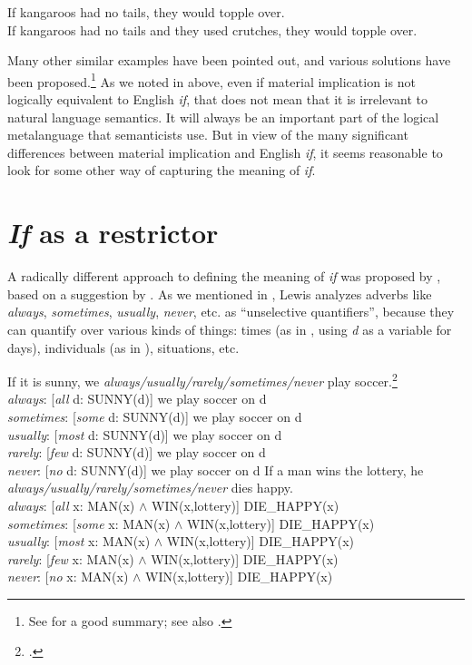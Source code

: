 \ea \label{ex:19.26}
\ea  If kangaroos had no tails, they would topple over.\\
\ex If kangaroos had no tails and they used crutches, they would topple over.
                       \z
\z


Many other similar examples have been pointed out, and various solutions have been proposed.\footnote{See  for a good summary; see also \textcites[83--87]{Gazdar1979}[ch2--3]{Bennett2003}.} As we noted in  above, even if material implication is not logically equivalent to English \textit{if}, that does not mean that it is irrelevant to natural language semantics. It will always be an important part of the logical metalanguage that semanticists use. But in view of the many significant differences between material implication and English \textit{if}, it seems reasonable to look for some other way of capturing the meaning of \textit{if}.


\section{\textit{If} as a restrictor}\label{sec:19.5}

A radically different approach to defining the meaning of \textit{if} was proposed by \citet{Kratzer1986}, based on a suggestion by \citet{Lewis1975}. As we mentioned in , Lewis analyzes adverbs like \textit{always}, \textit{sometimes}, \textit{usually}, \textit{never}, etc. as “unselective quantifiers”, because they can quantify over various kinds of things: times (as in , using \textit{d} as a variable for days), individuals (as in ), situations, etc.


\ea \label{ex:19.27}
If it is sunny, we \textit{always/usually/rarely/sometimes/never} play soccer.\footnote{\citet{Lewis1975}.}\\
\textit{always}:  [\textit{all} d: SUNNY(d)] we play soccer on d\\
\textit{sometimes}: [\textit{some} d: SUNNY(d)] we play soccer on d\\
\textit{usually}: [\textit{most} d: SUNNY(d)] we play soccer on d\\
\textit{rarely}: [\textit{few} d: SUNNY(d)] we play soccer on d\\
\textit{never}: [\textit{no} d: SUNNY(d)] we play soccer on d
\ex \label{ex:19.28}
If a man wins the lottery, he \textit{always/usually/rarely/sometimes/never} dies happy.\\
\textit{always}:  [\textit{all} x: MAN(x) $\wedge$ WIN(x,lottery)] DIE\_HAPPY(x)\\
\textit{sometimes}:  [\textit{some} x: MAN(x) $\wedge$ WIN(x,lottery)] DIE\_HAPPY(x)\\
\textit{usually}:  [\textit{most} x: MAN(x) $\wedge$ WIN(x,lottery)] DIE\_HAPPY(x)\\
\textit{rarely}:  [\textit{few} x: MAN(x) $\wedge$ WIN(x,lottery)] DIE\_HAPPY(x)\\
\textit{never}:  [\textit{no} x: MAN(x) $\wedge$ WIN(x,lottery)] DIE\_HAPPY(x)
\z


